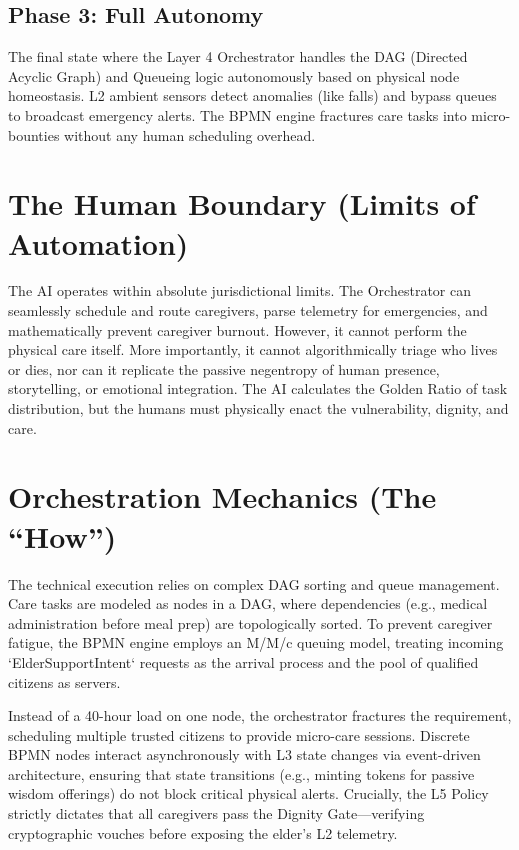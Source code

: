 \subsection{Phase 3: Full Autonomy}
The final state where the Layer 4 Orchestrator handles the DAG (Directed Acyclic Graph) and Queueing logic autonomously based on physical node homeostasis. L2 ambient sensors detect anomalies (like falls) and bypass queues to broadcast emergency alerts. The BPMN engine fractures care tasks into micro-bounties without any human scheduling overhead.

\section{The Human Boundary (Limits of Automation)}
The AI operates within absolute jurisdictional limits. The Orchestrator can seamlessly schedule and route caregivers, parse telemetry for emergencies, and mathematically prevent caregiver burnout. However, it cannot perform the physical care itself. More importantly, it cannot algorithmically triage who lives or dies, nor can it replicate the passive negentropy of human presence, storytelling, or emotional integration. The AI calculates the Golden Ratio of task distribution, but the humans must physically enact the vulnerability, dignity, and care.

\section{Orchestration Mechanics (The ``How'')}
The technical execution relies on complex DAG sorting and queue management. Care tasks are modeled as nodes in a DAG, where dependencies (e.g., medical administration before meal prep) are topologically sorted. To prevent caregiver fatigue, the BPMN engine employs an M/M/c queuing model, treating incoming `ElderSupportIntent` requests as the arrival process and the pool of qualified citizens as servers. 

Instead of a 40-hour load on one node, the orchestrator fractures the requirement, scheduling multiple trusted citizens to provide micro-care sessions. Discrete BPMN nodes interact asynchronously with L3 state changes via event-driven architecture, ensuring that state transitions (e.g., minting tokens for passive wisdom offerings) do not block critical physical alerts. Crucially, the L5 Policy strictly dictates that all caregivers pass the Dignity Gate---verifying cryptographic vouches before exposing the elder's L2 telemetry.
